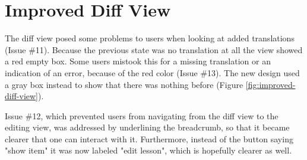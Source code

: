 




\section{Improved Diff View}
The diff view posed some problems to users when looking at added translations (Issue \#11). Because the previous state was no translation at all the view showed a red empty box. Some users mistook this for a missing translation or an indication of an error, because of the red color (Issue \#13). The new design used a gray box instead to show that there was nothing before (Figure \ref{fig:improved-diff-view}).

Issue \#12, which prevented users from navigating from the diff view to the editing view, was addressed by underlining the breadcrumb, so that it became clearer that one can interact with it. Furthermore, instead of the button saying "show item" it was now labeled "edit lesson", which is hopefully clearer as well.

